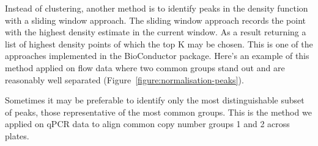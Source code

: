 Instead of clustering, another method is to identify peaks in the density function with a sliding window approach.
The sliding window approach records the point with the highest density estimate in the current window.
As a result returning a list of highest density points of which the top K may be chosen.
This is one of the approaches implemented in the  BioConductor package.
Here's an example of this method applied on flow data where two common groups stand out and are reasonably well separated (Figure~\ref{figure:normalisation-peaks}).

Sometimes it may be preferable to identify only the most distinguishable subset of peaks, those representative of the most common groups.
This is the method we applied on qPCR data to align common copy number groups 1 and 2 across plates.



